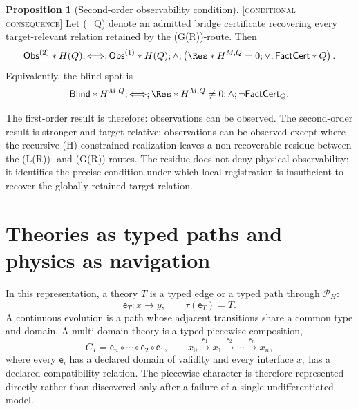 \documentclass[10pt,twoside,a5paper]{article}
\newcommand{\Pspace}{\ensuremath{\mathcal P_H}}
\newcommand{\Edge}{\ensuremath{\mathsf e}}
\theoremstyle{definition}
\newtheorem{claimprop}{Proposition}
\begin{document}
\begin{claimprop}[Second-order observability condition]
\label{prop:second-order-observability-condition}
\textsc{[conditional consequence]} Let
(_Q) denote an admitted bridge certificate recovering every
target-relevant relation retained by the (G(R))-route. Then
\begin{equation}
\mathsf{Obs}^{(2)}*H(Q)
;\Longleftrightarrow;
\mathsf{Obs}^{(1)}*H(Q)
;\wedge;
\left(
\Res*{H}^{M,Q}=0
;\vee;
\mathsf{FactCert}*Q
\right).
\label{eq:second-order-observability}
\end{equation}
Equivalently, the blind spot is
\begin{equation}
\mathsf{Blind}*{H}^{M,Q}
;\Longleftrightarrow;
\Res*{H}^{M,Q}\neq 0
;\wedge;
\neg\mathsf{FactCert}_Q.
\label{eq:H-self-selection-blind-spot}
\end{equation}
\end{claimprop}

The first-order result is therefore: observations can be observed. The
second-order result is stronger and target-relative: observations can be
observed except where the recursive (H)-constrained realization leaves a
non-recoverable residue between the (L(R))- and (G(R))-routes. The residue
does not deny physical observability; it identifies the precise condition under
which local registration is insufficient to recover the globally retained
target relation.

\section{Theories as typed paths and physics as navigation}
\label{sec:navigation}

In this representation, a theory $T$ is a typed edge or a typed path through
$\Pspace$:
\begin{equation}
\Edge_T:x\longrightarrow y,
\qquad \tau(\Edge_T)=T.
\label{eq:theory-edge}
\end{equation}
A continuous evolution is a path whose adjacent transitions share a common type and
domain. A multi-domain theory is a typed piecewise composition,
\begin{equation}
C_T=\Edge_n\circ\cdots\circ\Edge_2\circ\Edge_1,
\qquad
x_0\xrightarrow{\Edge_1}x_1\xrightarrow{\Edge_2}\cdots
\xrightarrow{\Edge_n}x_n,
\label{eq:piecewise}
\end{equation}
where every $\Edge_i$ has a declared domain of validity and every interface
$x_i$ has a declared compatibility relation. The piecewise character is therefore
represented directly rather than discovered only after a failure of a single
undifferentiated model.
\end{document}
